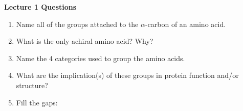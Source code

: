 \begin{center}

\textbf{Lecture 1 Questions}

\end{center}

\begin{enumerate}

\item Name all of the groups attached to the $\alpha$-carbon of an amino acid.


\item What is the only achiral amino acid? Why?


\item Name the 4 categories used to group the amino acids.


\item What are the implication(s) of these groups in protein function and/or structure?


\item Fill the gaps:


\end{enumerate}
